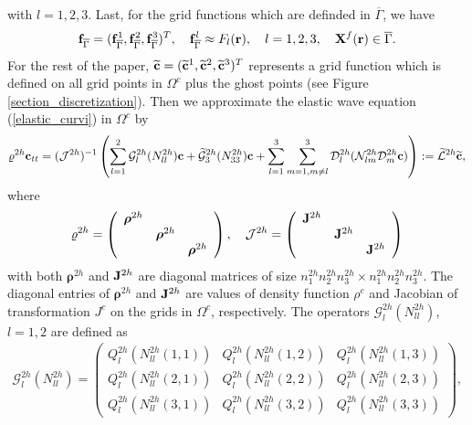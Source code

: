  with $l = 1,2,3$. Last, for the grid functions which are definded in $\overline{\Gamma}$, we have 
 \[{\bf f}_{\overline{\Gamma}} = ({\bf f}_{\overline{\Gamma}}^1, {\bf f}_{\overline{\Gamma}}^2, {\bf f}_{\overline{\Gamma}}^3)^T, \quad {\bf f}_{\overline{\Gamma}}^l\approx F_l({\bf r}), \quad l = 1,2,3, \quad {\bf X}^f({\bf r})\in\overline{\Gamma}.\]
 For the rest of the paper, $\widetilde{\bf c} = (\widetilde{\bf c}^1,\widetilde{\bf c}^2,\widetilde{\bf c}^3)^T$ represents a grid function which  is defined on all grid points in $\Omega^c$ plus the ghost points (see Figure \ref{section_discretization}). Then we approximate the elastic wave equation (\ref{elastic_curvi}) in $\Omega^c$ by
\begin{equation}\label{elastic_semi_c}
{\varrho}^{2h} {\bf c}_{tt} =( \mathcal{ J}^{2h})^{-1}\left(\sum_{l=1}^2\mathcal{G}_l^{2h}({N}_{ll}^{2h}){\bf c}+\wt{\mathcal{G}}_3^{2h}({N}_{33}^{2h}){{\bf c}}+\sum_{l=1}^3\sum_{m=1,m\neq l}^3\mathcal{D}_l^{2h}(\mathcal{N}_{lm}^{2h}\mathcal{D}_m^{2h}{\bf c})\right) := \wt{\mathcal{L}}^{2h} \wt{{\bf c}},
\end{equation}
where 
\begin{align}\label{rho_j}
\varrho^{2h} = \left(\begin{array}{ccc}
{\bm \rho}^{2h}& ~  & ~ \\
~ & {\bm \rho}^{2h} & ~ \\
~ &~  &{\bm \rho}^{2h}\end{array}\right),\ \ \ \mathcal{J}^{2h} = \left(\begin{array}{ccc}
{\bf J}^{2h}& ~  & ~ \\
~ & {\bf J}^{2h} & ~ \\
~ &~  &{\bf J}^{2h}\end{array}\right)
\end{align}
with both ${\bm \rho}^{2h}$ and ${\bf J}^{2h}$ are diagonal matrices of size  $n_1^{2h}n_2^{2h}n_3^{2h}\times n_1^{2h}n_2^{2h}n_3^{2h}$. The diagonal entries of ${\bm \rho}^{2h}$ and ${\bf J}^{2h}$ are values of density function $\rho^c$ and Jacobian of transformation $J^c$ on the grids in $\Omega^c$, respectively.
The operators $\mathcal{G}_l^{2h}({N}_{ll}^{2h})$, $l=1,2$ are defined as
\begin{align*}\label{g1122}
\mathcal{G}^{2h}_l({N}_{ll}^{2h}) = \left(\begin{array}{ccc}
Q_l^{2h}(N_{ll}^{2h}(1,1)) & Q_l^{2h}(N_{ll}^{2h}(1,2))  & Q_l^{2h}(N_{ll}^{2h}(1,3)) \\
Q_l^{2h}(N_{ll}^{2h}(2,1)) & Q_l^{2h}(N_{ll}^{2h}(2,2))  & Q_l^{2h}(N_{ll}^{2h}(2,3)) \\
Q_l^{2h}(N_{ll}^{2h}(3,1)) & Q_l^{2h}(N_{ll}^{2h}(3,2))  & Q_l^{2h}(N_{ll}^{2h}(3,3)) \end{array}\right),
\end{align*}
